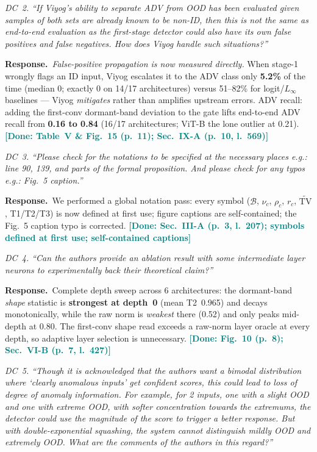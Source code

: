 \documentclass[10pt,letterpaper,journal]{IEEEtran}
\newcommand{\rc}[1]{\smallskip\noindent\textit{\textcolor{black!75}{#1}}\par\smallskip}
\newcommand{\rr}{\noindent\textbf{Response.}~}
\newcommand{\Linf}{$L_\infty$}
\newcommand{\done}[1]{\textcolor{teal}{\textbf{[Done: #1]}}}
\begin{document}
\rc{DC~2. ``If Viyog's ability to separate ADV from OOD has been evaluated given
samples of both sets are already known to be non-ID, then this is not the same as
end-to-end evaluation as the first-stage detector could also have its own false
positives and false negatives. How does Viyog handle such situations?''}

\rr \emph{False-positive propagation is now measured directly.} When stage-1
wrongly flags an ID input, Viyog escalates it to the ADV class only
\textbf{5.2\%} of the time (median 0; exactly 0 on 14/17 architectures) versus
51--82\% for logit/\Linf{} baselines --- Viyog \emph{mitigates} rather than
amplifies upstream errors. ADV recall: adding the first-conv dormant-band
deviation to the gate lifts end-to-end ADV recall from \textbf{0.16 to 0.84}
(16/17 architectures; ViT-B the lone outlier at 0.21).
\done{Table~V \& Fig.~15 (p.~11); Sec.~IX-A (p.~10, l.~569)}

\rc{DC~3. ``Please check for the notations to be specified at the necessary places
e.g.: line 90, 139, and parts of the formal proposition. And please check for any
typos e.g.: Fig.~5 caption.''}

\rr We performed a global notation pass: every symbol ($\mathcal{B}$, $\nu_c$,
$\rho_c$, $r_c$, $\widetilde{\mathrm{TV}}$, T1/T2/T3) is now defined at first
use; figure captions are self-contained; the Fig.~5 caption typo is corrected.
\done{Sec.~III-A (p.~3, l.~207); symbols defined at first use; self-contained captions}

\rc{DC~4. ``Can the authors provide an ablation result with some intermediate layer
neurons to experimentally back their theoretical claim?''}

\rr Complete depth sweep across 6 architectures: the dormant-band \emph{shape}
statistic is \textbf{strongest at depth~0} (mean T2~0.965) and decays
monotonically, while the raw norm is \emph{weakest} there (0.52) and only peaks
mid-depth at 0.80. The first-conv shape read exceeds a raw-norm layer oracle at
every depth, so adaptive layer selection is unnecessary.
\done{Fig.~10 (p.~8); Sec.~VI-B (p.~7, l.~427)}

\rc{DC~5. ``Though it is acknowledged that the authors want a bimodal distribution
where `clearly anomalous inputs' get confident scores, this could lead to loss of
degree of anomaly information. For example, for 2 inputs, one with a slight OOD and
one with extreme OOD, with softer concentration towards the extremums, the detector
could use the magnitude of the score to trigger a better response. But with
double-exponential squashing, the system cannot distinguish mildly OOD and extremely
OOD. What are the comments of the authors in this regard?''}
\end{document}
